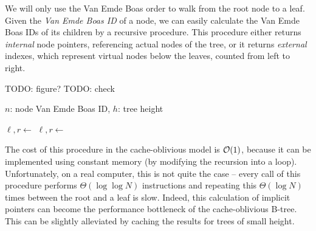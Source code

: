We will only use the Van Emde Boas order to walk from the root node to a leaf.
Given the \textit{Van Emde Boas ID} of a node,
we can easily calculate the Van Emde Boas IDs of its children by
a recursive procedure. This procedure either returns \textit{internal} node
pointers, referencing actual nodes of the tree, or it returns \textit{external}
indexes, which represent virtual nodes below the leaves, counted from left
to right.

TODO: figure?
TODO: check
\begin{algorithmic}
 {$n$: node Van Emde Boas ID, $h$: tree height}
	  \EndIf

	 
	 

		\State $\ell, r \gets$ 
			\State {}
		\Else{}
			\State {}
		\EndIf
	\Else
		\State $\ell,r\gets$ 
			\State {}
		\Else
			 
			\State {}
		\EndIf
	\EndIf
\EndFunction
\end{algorithmic}

The cost of this procedure in the cache-oblivious model is $\mathcal{O}(1)$, because
it can be implemented using constant memory (by modifying the recursion into
a loop). Unfortunately, on a real computer, this is not quite the case --
every call of this procedure performs $\Theta(\log\log N)$ instructions and
repeating this $\Theta(\log N)$ times between the root and a leaf is slow.
Indeed, this calculation of implicit pointers can become the performance
bottleneck of the cache-oblivious B-tree.
This can be slightly alleviated by caching the results for trees of small
height.

